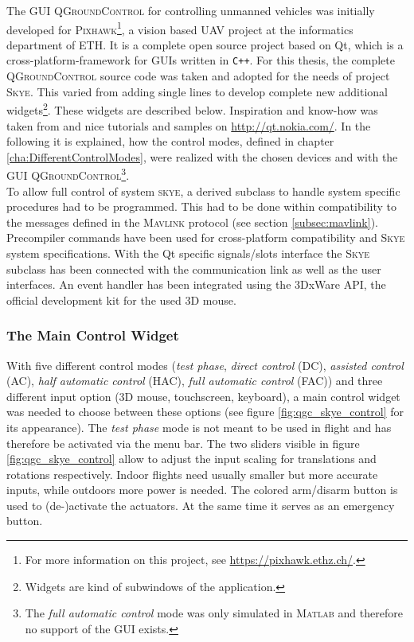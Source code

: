 The GUI \textsc{QGroundControl} for controlling unmanned vehicles was initially developed for \textsc{Pixhawk}\footnote{For more information on this project, see \url{https://pixhawk.ethz.ch/}.}, a vision based UAV project at the informatics department of \textsc{ETH}. It is a complete open source project based on Qt, which is a cross-platform-framework for GUIs written in \verb!C++!. For this thesis, the complete \textsc{QGroundControl} source code was taken and adopted for the needs of project \textsc{Skye}. This varied from adding single lines to develop complete new additional widgets\footnote{Widgets are kind of subwindows of the application.}. These widgets are described below. Inspiration and know-how was taken from \cite{blanchette} and nice tutorials and samples on \url{http://qt.nokia.com/}. In the following it is explained, how the control modes, defined in chapter \ref{cha:DifferentControlModes}, were realized with the chosen devices and with the GUI \textsc{QGroundControl}\footnote{The \textit{full automatic control} mode was only simulated in \textsc{Matlab} and therefore no support of the GUI exists.}. 
\\
To allow full control of system \textsc{skye}, a derived subclass to handle system specific procedures had to be programmed. 
This had to be done within compatibility to the messages defined in the \textsc{Mavlink} protocol (see section \ref{subsec:mavlink}). Precompiler commands have been used for cross-platform compatibility and \textsc{Skye} system specifications. 
With the Qt specific signals/slots interface the \textsc{Skye} subclass has been connected with the communication link as well as the user interfaces. 
An event handler has been integrated using the 3DxWare API, the official development kit for the used 3D mouse.

\subsubsection{The Main Control Widget}
With five different control modes (\textit{test phase}, \textit{direct control} (DC), \textit{assisted control} (AC), \textit{half automatic control} (HAC), \textit{full automatic control} (FAC)) and three different input option (3D mouse, touchscreen, keyboard), a main control widget was needed to choose between these options (see figure \ref{fig:qgc_skye_control} for its appearance). 
The \textit{test phase} mode is not meant to be used in flight and has therefore be activated via the menu bar.
The two sliders visible in figure \ref{fig:qgc_skye_control} allow to adjust the input scaling for translations and rotations respectively. Indoor flights need usually smaller but more accurate inputs, while outdoors more power is needed. The colored arm/disarm button is used to (de-)activate the actuators. At the same time it serves as an emergency button.

